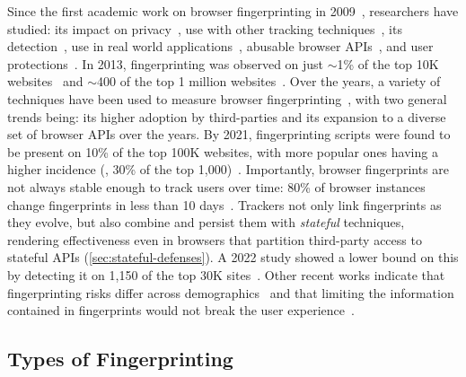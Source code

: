 Since the first academic work on browser fingerprinting in 2009~\cite{mayerAnyPersonPamphleteer2009}, researchers have studied: its impact on privacy~\cite{eckersleyHowUniqueYour2010}, use with other tracking techniques~\cite{fouadMyCookiePhoenix2022}, its detection~\cite{iqbalFingerprintingFingerprintersLearning2021, boussahaFPtracerFinegrainedBrowser2024}, use in real world applications~\cite{aminazadWebRunner20492020, wuHimManyFaces2023}, abusable browser APIs~\cite{bahramiFPRadarLongitudinalMeasurement2022, suAutomaticDiscoveryEmerging2023, senolDoubleEdgedSword2024}, and user protections~\cite{vastelFpScannerPrivacyImplications2018}. 
%
In 2013, fingerprinting was observed on just $\sim$1\% of the top 10K websites~\cite{nikiforakisCookielessMonsterExploring2013} and $\sim$400 of the top 1 million websites~\cite{acarFPDetectiveDustingWeb2013}. 
%
Over the years, a variety of techniques have been used to measure browser fingerprinting~\cite{acarWebNeverForgets2014,englehardtOnlineTracking1millionsite2016,olejnikBatteryStatusNot2017,dasWebsSixthSense2018}, with two general trends being: its higher adoption by third-parties and its expansion to a diverse set of browser APIs over the years. 
%
By 2021, fingerprinting scripts were found to be present on 10\% of the top 100K websites, with more popular ones having a higher incidence (\ie{}, 30\% of the top 1,000)~\cite{iqbalFingerprintingFingerprintersLearning2021}.
%
Importantly, browser fingerprints are not always stable enough to track users over time: 80\% of browser instances change fingerprints in less than 10 days~\cite{vastelFPSTALKERTrackingBrowser2018}. 
%
Trackers not only link fingerprints as they evolve, but also combine and persist them with \textit{stateful} techniques, rendering effectiveness even in browsers that partition third-party access to stateful APIs (\autoref{sec:stateful-defenses}). 
%
A 2022 study showed a lower bound on this by detecting it on 1,150 of the top 30K sites~\cite{fouadMyCookiePhoenix2022}.
%
Other recent works indicate that fingerprinting risks differ across demographics~\cite{berkeHowUniqueWhose2025} and that limiting the information contained in fingerprints would not break the user experience~\cite{intumwayaseUARadarExploringImpact2023}.


\vspace{-2mm}
\subsection{Types of Fingerprinting}
\label{sec:types-of-fingerprinting}
\vspace{-3mm}


